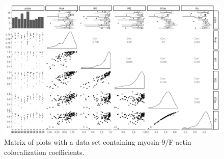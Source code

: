 \documentclass[english,authoryear]{elsarticle}
\begin{document}
\begin{figure}
  \includegraphics[width=1\linewidth]{supp1.jpeg}
  \caption{Matrix of plots with a data set containing myosin-9/F-actin colocalization coefficients.}
  \label{supp1}
  \centering
\end{figure}
\end{document}
